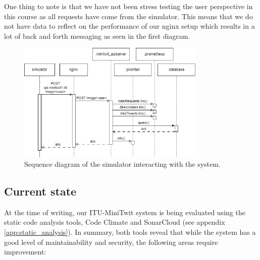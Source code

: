 One thing to note is that we have not been stress testing the user perspective in this course as all requests have come from the simulator. This means that we do not have data to reflect on the performance of our nginx setup which results in a lot of back and forth messaging as seen in the first diagram. 

\begin{figure}[H]
    \centering
    \includegraphics[width=0.8\textwidth]{images/sequence-simulator.png}
    \caption{Sequence diagram of the simulator interacting with the system.}
    \label{fig:sim_sequence}
\end{figure}




\subsection{Current state}
\label{sec:current-state}

At the time of writing, our ITU-MiniTwit system is being evaluated using the static code analysis tools, Code Climate and SonarCloud (see appendix \ref{app:static_analysis}). 
In summary, both tools reveal that while the system has a good level of maintainability and security, the following areas require improvement:

